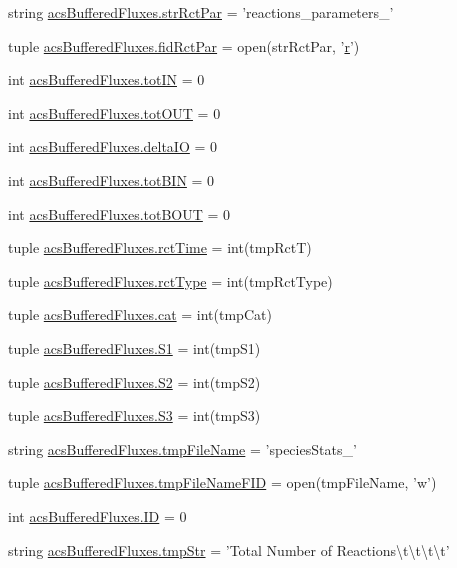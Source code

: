 \begin{DoxyCompactItemize}
\item 
string \hyperlink{a00098_ac571c8d78a216f58ebc1e37bef25a541}{acs\-Buffered\-Fluxes.\-str\-Rct\-Par} = 'reactions\-\_\-parameters\-\_\-'
\item 
tuple \hyperlink{a00098_af949c46aab0625cd7bbed10b8a484f8b}{acs\-Buffered\-Fluxes.\-fid\-Rct\-Par} = open(str\-Rct\-Par, '\hyperlink{a00031_ac862e7284527eb913b1351c8bfb8e079}{r}')
\item 
int \hyperlink{a00098_a59bf56491943c5f1414e0cc407b48b93}{acs\-Buffered\-Fluxes.\-tot\-I\-N} = 0
\item 
int \hyperlink{a00098_a730efee103fd41819ea5848cec249d07}{acs\-Buffered\-Fluxes.\-tot\-O\-U\-T} = 0
\item 
int \hyperlink{a00098_ae908941897ea01dca9c2be46363f1845}{acs\-Buffered\-Fluxes.\-delta\-I\-O} = 0
\item 
int \hyperlink{a00098_ae057f24c5c495bb01544251db7e74ad9}{acs\-Buffered\-Fluxes.\-tot\-B\-I\-N} = 0
\item 
int \hyperlink{a00098_a3da6f0cfe81256d19a801c63ccbe0c96}{acs\-Buffered\-Fluxes.\-tot\-B\-O\-U\-T} = 0
\item 
tuple \hyperlink{a00098_a8bce447521fd3dec6adb8f7603f8ea4e}{acs\-Buffered\-Fluxes.\-rct\-Time} = int(tmp\-Rct\-T)
\item 
tuple \hyperlink{a00098_a154a987096ec19ec5944920f52003171}{acs\-Buffered\-Fluxes.\-rct\-Type} = int(tmp\-Rct\-Type)
\item 
tuple \hyperlink{a00098_ad351972f8ea18b9bf9b58f572c84534e}{acs\-Buffered\-Fluxes.\-cat} = int(tmp\-Cat)
\item 
tuple \hyperlink{a00098_ab1521c41c4bbd4df7a741e0f58e760f1}{acs\-Buffered\-Fluxes.\-S1} = int(tmp\-S1)
\item 
tuple \hyperlink{a00098_a812cd646e9a7a994e7ec3eae8c2371f4}{acs\-Buffered\-Fluxes.\-S2} = int(tmp\-S2)
\item 
tuple \hyperlink{a00098_ad28d690663b4722db331f9046d80d16c}{acs\-Buffered\-Fluxes.\-S3} = int(tmp\-S3)
\item 
string \hyperlink{a00098_ae8f3277c929e5b042e62360eaffe3f22}{acs\-Buffered\-Fluxes.\-tmp\-File\-Name} = 'species\-Stats\-\_\-'
\item 
tuple \hyperlink{a00098_ad593217d9c7c4bdbdc2bbac8cec07790}{acs\-Buffered\-Fluxes.\-tmp\-File\-Name\-F\-I\-D} = open(tmp\-File\-Name, 'w')
\item 
int \hyperlink{a00098_a111fff157346d1e3888a229584206d0a}{acs\-Buffered\-Fluxes.\-I\-D} = 0
\item 
string \hyperlink{a00098_a5b34c38ff1251831412c297823a2a945}{acs\-Buffered\-Fluxes.\-tmp\-Str} = 'Total Number of Reactions\textbackslash{}t\textbackslash{}t\textbackslash{}t\textbackslash{}t'
\end{DoxyCompactItemize}
